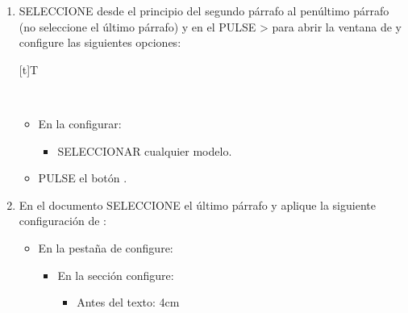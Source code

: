 \documentclass[letterpaper,10pt,spanish]{sphinxmanual}
\let\sphinxpxdimen\pdfpxdimen\else\newdimen\sphinxpxdimen
\begin{document}
\begin{enumerate}
\begin{itemize}
\begin{itemize}
\begin{itemize}
\end{itemize}

\end{itemize}

\item {} 
\sphinxAtStartPar
PULSAR el botón .

\end{itemize}

\item {} 
\sphinxAtStartPar
SELECCIONE desde el principio del segundo párrafo al penúltimo párrafo (no seleccione el último párrafo) y en el  PULSE  >  para abrir la ventana de  y configure las siguientes opciones:


\begin{savenotes}\sphinxattablestart
\sphinxthistablewithglobalstyle
\centering
\begin{tabulary}{\linewidth}[t]{T}
\sphinxtoprule
\sphinxtableatstartofbodyhook

\begin{sphinxfigure-in-table}
\centering

\noindent\sphinxincludegraphics[width=650\sphinxpxdimen]{{image133}.png}
\end{sphinxfigure-in-table}\relax
\\
\sphinxbottomrule
\end{tabulary}
\sphinxtableafterendhook\par
\sphinxattableend\end{savenotes}
\begin{itemize}
\item {} 
\sphinxAtStartPar
En la  configurar:
\begin{itemize}
\item {} 
\sphinxAtStartPar
SELECCIONAR cualquier modelo.

\end{itemize}

\item {} 
\sphinxAtStartPar
PULSE el botón .

\end{itemize}

\item {} 
\sphinxAtStartPar
En el documento SELECCIONE el último párrafo y aplique la siguiente configuración de :
\begin{itemize}
\item {} 
\sphinxAtStartPar
En la pestaña de  configure:
\begin{itemize}
\item {} 
\sphinxAtStartPar
En la sección  configure:
\begin{itemize}
\item {} 
\sphinxAtStartPar
Antes del texto: 4cm


\end{itemize}
\end{itemize}
\end{itemize}
\end{enumerate}
\end{document}
